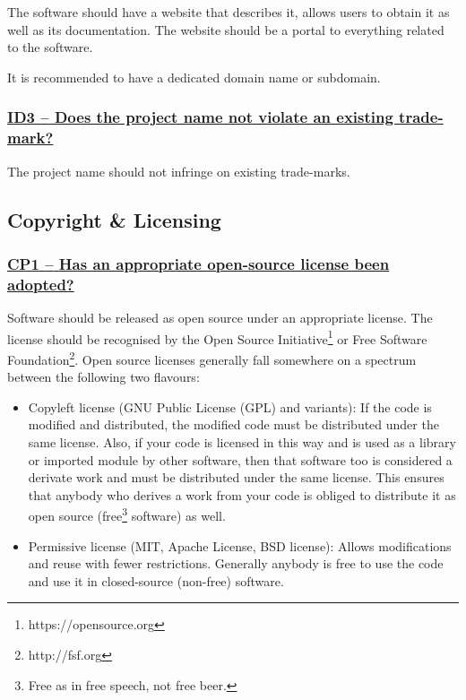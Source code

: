 \documentclass[a4paper,11pt]{article}
\newcommand{\indicator}[1]{\subsubsection*{\underline{#1}}}
\begin{document}
The software should have a website that describes it, allows users to obtain
it as well as its documentation. The website should be a portal to everything
related to the software.

It is recommended to have a dedicated domain name or subdomain.

\newcommand{\idThreeName}{ID3}
\newcommand{\idThreeID}{\idThreeName}
\newcommand{\idThreeText}{Does the project name not violate an existing trade-mark?}
\indicator{\idThreeName{ }--{ }\idThreeText}\label{id:id3} 

The project name should not infringe on existing trade-marks.

\subsection{Copyright \& Licensing}\label{sec:cop}

\newcommand{\cpOneName}{CP1}
\newcommand{\cpOneID}{\cpOneName}
\newcommand{\cpOneText}{Has an appropriate open-source license been adopted?}
\indicator{\cpOneName{ }--{ }\cpOneText}\label{id:cp1} 

Software should be released as open source under an appropriate license. The
license should be recognised by the Open Source Initiative\footnote{https://opensource.org} or Free Software
Foundation\footnote{http://fsf.org}. Open source licenses generally fall somewhere on a spectrum between the following two flavours:

\begin{itemize}
 \item Copyleft license (GNU Public License (GPL) and variants): If the code is modified and distributed, the modified code must be distributed under the same license. Also, if your code is licensed in this way and is used as a library or imported module by other software, then that software too is considered a derivate work and must be distributed under the same license. This ensures that anybody who derives a work from your code is obliged to distribute it as open source (free\footnote{Free as in free speech, not free beer.} software) as well.
 \item Permissive license (MIT, Apache License, BSD license): Allows modifications and reuse with fewer restrictions. Generally anybody is free to use the code and use it in closed-source (non-free) software.
\end{itemize}
\end{document}
